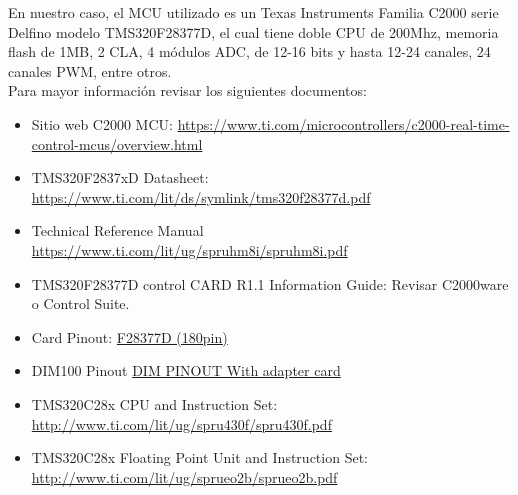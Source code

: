 En nuestro caso, el MCU utilizado es un Texas Instruments Familia C2000 serie Delfino modelo TMS320F28377D, el cual tiene doble CPU de 200Mhz, memoria flash de 1MB, 2 CLA, 4 módulos ADC, de 12-16 bits y hasta 12-24 canales, 24 canales PWM, entre otros.\\
Para mayor información revisar los siguientes documentos:
\begin{itemize}
		\item Sitio web C2000 MCU: \href{https://www.ti.com/microcontrollers/c2000-real-time-control-mcus/overview.html}{https://www.ti.com/microcontrollers/c2000-real-time-control-mcus/overview.html}
		\item TMS320F2837xD Datasheet: \href{https://www.ti.com/lit/ds/symlink/tms320f28377d.pdf}{https://www.ti.com/lit/ds/symlink/tms320f28377d.pdf}
		\item Technical Reference Manual \href{https://www.ti.com/lit/ug/spruhm8i/spruhm8i.pdf}{https://www.ti.com/lit/ug/spruhm8i/spruhm8i.pdf}
		\item TMS320F28377D control CARD R1.1 Information Guide: Revisar C2000ware o Control Suite.
		
		\item Card Pinout: \href{https://e2e.ti.com/cfs-file/__key/communityserver-discussions-components-files/171/2766.TMDSCNCD28377D_5F00_180cCARD_5F00_pinout_5F00_R1_5F00_1.pdf}{F28377D (180pin)}
		
		\item DIM100 Pinout \href{https://e2e.ti.com/cfs-file/__key/communityserver-discussions-components-files/171/TMDSCNCD28377D_5F00_100DIMmap_5F00_R1_5F00_1.pdf}{DIM PINOUT With adapter card}
		
		\item TMS320C28x CPU and Instruction Set: \href{http://www.ti.com/lit/ug/spru430f/spru430f.pdf}{http://www.ti.com/lit/ug/spru430f/spru430f.pdf}
		\item 
		\begin{flushleft}
		TMS320C28x Floating Point Unit and Instruction Set: \href{http://www.ti.com/lit/ug/sprueo2b/sprueo2b.pdf}{http://www.ti.com/lit/ug/sprueo2b/sprueo2b.pdf}
		\end{flushleft}
\end{itemize}


